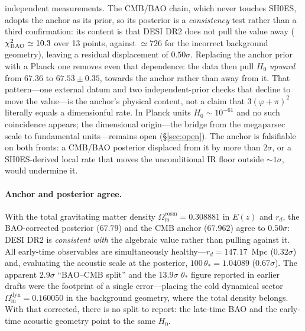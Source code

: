 \documentclass[aps,prd,preprint,amsmath,amssymb,nofootinbib,longbibliography]{revtex4-2}
\newcommand{\Om}{\Omega_{\mathrm{m}}}
\begin{document}
independent measurements. The CMB/BAO chain, which never touches SH0ES, adopts
the anchor as its prior, so its posterior is a \emph{consistency} test rather
than a third confirmation: its content is that DESI DR2 does not pull the value
away ($\chi^2_{\rm BAO}\simeq10.3$ over 13 points, against $\simeq726$ for the
incorrect background geometry), leaving a residual displacement of
$0.50\sigma$. Replacing the anchor prior with a Planck one removes even that
dependence: the data then pull $H_0$ \emph{upward} from $67.36$ to
$67.53\pm0.35$, towards the anchor rather than away from it. That
pattern---one external datum and two independent-prior checks that decline to
move the value---is the anchor's physical content, not a claim that
$3(\varphi+\pi)^2$ literally equals a dimensionful rate. In Planck units
$H_0\sim10^{-61}$ and no such coincidence appears; the dimensional
origin---the bridge from the megaparsec scale to fundamental units---remains
open (\S\ref{sec:open}). The anchor is falsifiable on both fronts: a CMB/BAO
posterior displaced from it by more than $2\sigma$, or a SH0ES-derived local
rate that moves the unconditional IR floor outside $\sim1\sigma$, would
undermine it.

\paragraph{Anchor and posterior agree.} With the total gravitating matter
density $\Om^{\mathrm{cosm}}=0.308881$ in $E(z)$ and $r_d$, the BAO-corrected
posterior ($67.79$) and the CMB anchor ($67.962$) agree to $0.50\sigma$: DESI
DR2 is \emph{consistent with} the algebraic value rather than pulling against
it. All early-time observables are simultaneously healthy---$r_d=147.17$~Mpc
($0.32\sigma$) and, evaluating the acoustic scale at the posterior,
$100\,\theta_\ast=1.04089$ ($0.67\sigma$). The apparent $2.9\sigma$
``BAO--CMB split'' and the $13.9\sigma$ $\theta_\ast$ figure reported in earlier
drafts were the footprint of a single error---placing the cold dynamical sector
$\Om^{\mathrm{dyn}}=0.160050$ in the background geometry, where the total density
belongs. With that corrected, there is no split to report: the late-time BAO and
the early-time acoustic geometry point to the same $H_0$.
\end{document}
